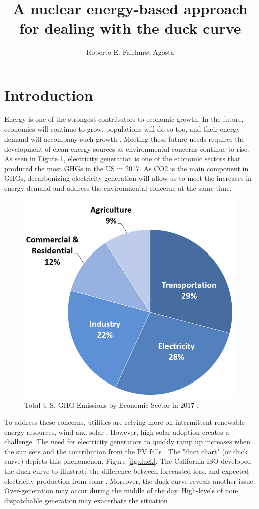 \documentclass{anstrans}
\title{A nuclear energy-based approach for dealing with the duck curve}
\author{Roberto E. Fairhurst Agosta}
\institute{
University of Illinois at Urbana-Champaign, Dept. of Nuclear, Plasma, and Radiological Engineering\\
ref3@illinois.edu
}
\begin{document}
\section{Introduction}
\label{intro}

Energy is one of the strongest contributors to economic growth.
In the future, economies will continue to grow, populations will do so too, and their energy demand will accompany such growth \cite{burke_impact_2018}.
Meeting these future needs requires the development of clean energy sources as environmental concerns continue to rise.
As seen in Figure \ref{fig:ghg}, electricity generation is one of the economic sectors that produced the most \glspl{GHG} in the \gls{US} in 2017.
As \gls{CO2} is the main component in \glspl{GHG}, decarbonizing electricity generation will allow us to meet the increases in energy demand and address the environmental concerns at the same time.

\begin{figure}[htbp!]
	\centering
	\includegraphics[width=0.6\linewidth]{figures/total-ghg-2019-caption2.png}
	\hfill
	\caption{Total U.S. GHG Emissions by Economic Sector in 2017 \cite{us_epa_sources_2020}.}
	\label{fig:ghg}
\end{figure}

To address these concerns, utilities are relying more on intermittent renewable energy resources, wind and solar \cite{ming_resource_2019}.
However, high solar adoption creates a challenge. The need for electricity generators to quickly ramp up increases when the sun sets and the contribution from the \gls{PV} falls \cite{us_department_of_energy_confronting_2017}.
The "duct chart" (or duck curve) depicts this phenomenon, Figure \ref{fig:duck}.
The California ISO developed the duck curve to illustrate the difference between forecasted load and expected electricity production from solar \cite{bouillon_prepared_2014}.
Moreover, the duck curve reveals another issue. Over-generation may occur during the middle of the day. High-levels of non-dispatchable generation may exacerbate the situation \cite{bouillon_prepared_2014}.
\end{document}
